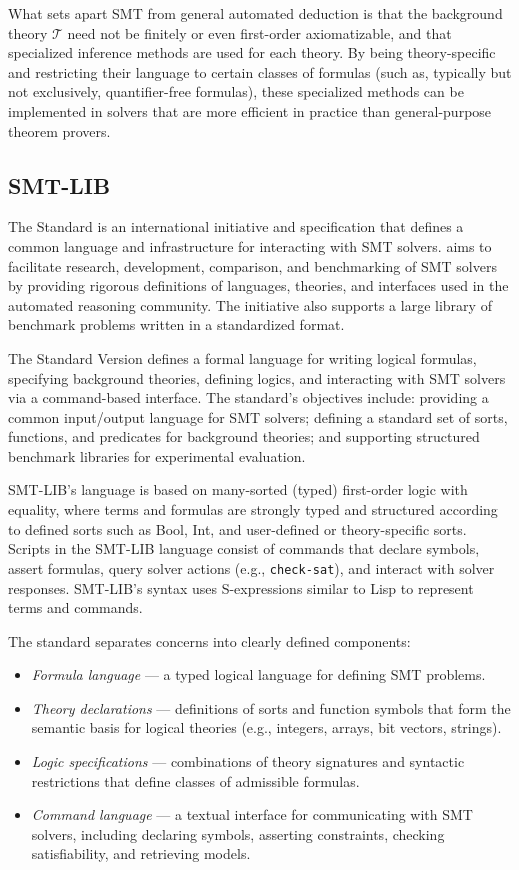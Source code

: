 What sets apart SMT from general automated deduction is that the background theory $\mathcal{T}$ need not be finitely or even first-order axiomatizable, and that specialized inference methods are used for each theory.
By being theory-specific and restricting their language to certain classes of formulas (such as, typically but not exclusively, quantifier-free formulas), these specialized methods can be implemented in solvers that are more efficient in practice than general-purpose theorem provers.

\subsection{SMT-LIB}


The \smtlib Standard is an international initiative and specification that defines a common language and infrastructure for interacting with SMT solvers.
\smtlib aims to facilitate research, development, comparison, and benchmarking of SMT solvers by providing rigorous definitions of languages, theories, and interfaces used in the automated reasoning community.
The initiative also supports a large library of benchmark problems written in a standardized format.

The \smtlib Standard Version defines a formal language for writing logical formulas, specifying background theories, defining logics, and interacting with SMT solvers via a command-based interface. The standard’s objectives include: providing a common input/output language for SMT solvers; defining a standard set of sorts, functions, and predicates for background theories; and supporting structured benchmark libraries for experimental evaluation.

SMT-LIB’s language is based on many-sorted (typed) first-order logic with equality, where terms and formulas are strongly typed and structured according to defined sorts such as Bool, Int, and user-defined or theory-specific sorts.
Scripts in the SMT-LIB language consist of commands that declare symbols, assert formulas, query solver actions (e.g., \texttt{check-sat}), and interact with solver responses.
SMT-LIB’s syntax uses S-expressions similar to Lisp to represent terms and commands.

The standard separates concerns into clearly defined components:
\begin{itemize}
    \item \emph{Formula language} — a typed logical language for defining SMT problems.
    \item \emph{Theory declarations} — definitions of sorts and function symbols that form the semantic basis for logical theories (e.g., integers, arrays, bit vectors, strings).
    \item \emph{Logic specifications} — combinations of theory signatures and syntactic restrictions that define classes of admissible formulas.
    \item \emph{Command language} — a textual interface for communicating with SMT solvers, including declaring symbols, asserting constraints, checking satisfiability, and retrieving models.
\end{itemize}

